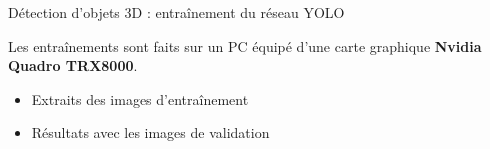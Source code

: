 \documentclass[11pt,serif,mathserif,compress,hyperref={colorlinks}]{beamer}
\begin{document}
\begin{frame}{Détection d'objets 3D : entraînement du réseau YOLO}
  
  Les entraînements sont faits sur un PC équipé d'une carte graphique \textbf{Nvidia Quadro TRX8000}.

  \begin{tcolorbox}[title={Contenu des dossiers d'entraînement\\ \textbf{UCIA-YOLOvvv/batch-BB\_epo-EEE/}}, height=60mm]
    
    \begin{itemize} 
    \item<2-> Extraits des images d'entraînement\\
    \item<4-> Résultats avec les images de validation  \\

\end{itemize}
\end{tcolorbox}
\end{frame}
\end{document}
